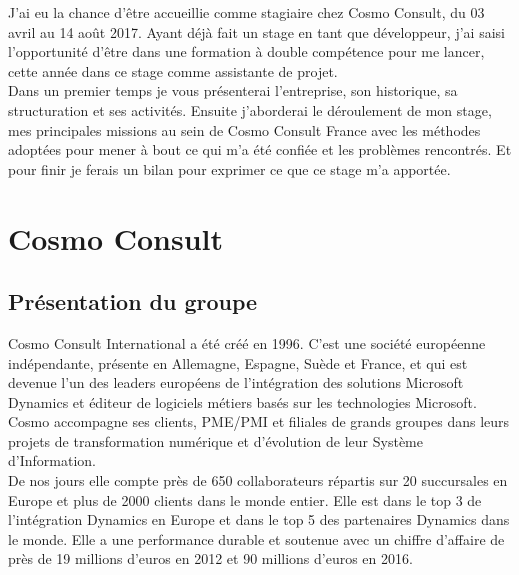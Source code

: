 \documentclass[12pt]{article}
\begin{document}
\hspace{1cm} J'ai eu la chance d'être accueillie comme stagiaire chez Cosmo Consult, du 03 avril au 14 août 2017. Ayant déjà fait un stage en tant que développeur, j'ai saisi l'opportunité d'être dans une formation à double compétence pour me lancer, cette année dans ce stage comme assistante de projet.\\ 
 
\hspace{1cm} Dans un premier temps je vous présenterai l'entreprise, son historique, sa structuration et ses activités. Ensuite j'aborderai le déroulement de mon stage, mes principales missions au sein de Cosmo Consult France avec les méthodes adoptées pour mener à bout ce qui m'a été confiée et les problèmes rencontrés. Et pour finir je ferais un bilan pour exprimer ce que ce stage m'a apportée.

\newpage
\section{Cosmo Consult}
	\subsection{Présentation du groupe}
\hspace{1cm} Cosmo Consult International a été créé en 1996. C'est une société européenne indépendante, présente en Allemagne, Espagne, Suède et France, et qui est devenue l'un des leaders européens de l’intégration des solutions Microsoft Dynamics et éditeur de logiciels métiers basés sur les technologies Microsoft.  Cosmo accompagne ses clients, PME/PMI et filiales de grands groupes dans leurs projets de transformation numérique et d’évolution de leur Système d’Information.\\

\hspace{1cm} De nos jours elle compte près de 650 collaborateurs répartis sur 20 succursales en Europe et plus de 2000 clients dans le monde entier. Elle est dans le top 3 de l'intégration Dynamics en Europe et dans le top 5 des partenaires Dynamics dans le monde. Elle a une performance durable et soutenue avec un chiffre d'affaire de près de 19 millions d'euros en 2012 et 90 millions d'euros en 2016. 
\end{document}
